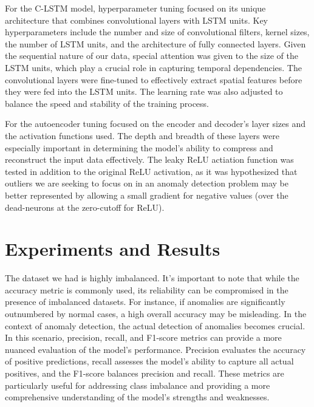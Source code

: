 \documentclass[10pt,twocolumn,letterpaper]{article}
\begin{document}
For the C-LSTM model, hyperparameter tuning focused on its unique architecture that combines convolutional layers with LSTM units. 
Key hyperparameters include the number and size of convolutional filters, kernel sizes, the number of LSTM units, and the architecture of fully connected layers. 
Given the sequential nature of our data, special attention was given to the size of the LSTM units, which play a crucial role in capturing temporal dependencies.
The convolutional layers were fine-tuned to effectively extract spatial features before they were fed into the LSTM units. The learning rate was also 
adjusted to balance the speed and stability of the training process.

For the autoencoder tuning focused on the encoder and decoder's layer sizes and the activation functions used. The depth and breadth of these layers were 
especially important in determining the model's ability to compress and reconstruct the input data effectively. The leaky ReLU actiation function was tested
in addition to the original ReLU activation, as it was hypothesized that outliers we are seeking to focus on in an anomaly detection problem may be better 
represented by allowing a small gradient for negative values (over the dead-neurons at the zero-cutoff for ReLU).

\section*{Experiments and Results}
The dataset we had is highly imbalanced. It's important to note that while the accuracy metric is commonly used, its reliability can be 
compromised in the presence of imbalanced datasets. For instance, if anomalies are significantly outnumbered by normal cases, a high overall 
accuracy may be misleading. In the context of anomaly detection, the actual detection of anomalies becomes crucial.
In this scenario, precision, recall, and F1-score metrics can provide a more nuanced evaluation of the model's performance. 
Precision evaluates the accuracy of positive predictions, recall assesses the model's ability to capture all actual positives, and the F1-score 
balances precision and recall. These metrics are particularly useful for addressing class imbalance and providing a more comprehensive understanding of 
the model's strengths and weaknesses.
\end{document}
